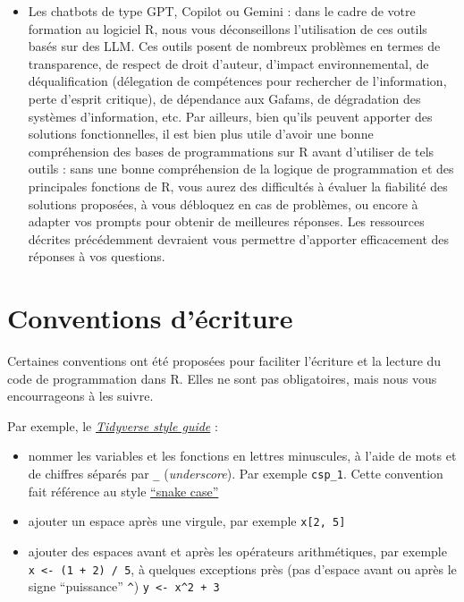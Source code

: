 \documentclass[
]{book}
\providecommand{\tightlist}{%
  \setlength{\itemsep}{0pt}\setlength{\parskip}{0pt}}
\begin{document}
\begin{itemize}
\item
  Les chatbots de type GPT, Copilot ou Gemini : dans le cadre de votre formation au logiciel R, nous vous déconseillons l'utilisation de ces outils basés sur des LLM. Ces outils posent de nombreux problèmes en termes de transparence, de respect de droit d'auteur, d'impact environnemental, de déqualification (délegation de compétences pour rechercher de l'information, perte d'esprit critique), de dépendance aux Gafams, de dégradation des systèmes d'information, etc. Par ailleurs, bien qu'ils peuvent apporter des solutions fonctionnelles, il est bien plus utile d'avoir une bonne compréhension des bases de programmations sur R avant d'utiliser de tels outils : sans une bonne compréhension de la logique de programmation et des principales fonctions de R, vous aurez des difficultés à évaluer la fiabilité des solutions proposées, à vous débloquez en cas de problèmes, ou encore à adapter vos prompts pour obtenir de meilleures réponses. Les ressources décrites précédemment devraient vous permettre d'apporter efficacement des réponses à vos questions.
\end{itemize}

\section{Conventions d'écriture}\label{conventions-duxe9criture}

Certaines conventions ont été proposées pour faciliter l'écriture et la lecture du code de programmation dans R. Elles ne sont pas obligatoires, mais nous vous encourrageons à les suivre.

Par exemple, le \href{https://style.tidyverse.org/}{\emph{Tidyverse style guide}} :

\begin{itemize}
\tightlist
\item
  nommer les variables et les fonctions en lettres minuscules, à l'aide de mots et de chiffres séparés par \texttt{\_} (\emph{underscore}). Par exemple \texttt{csp\_1}. Cette convention fait référence au style \href{https://en.wikipedia.org/wiki/Snake_case}{``snake case''}
\item
  ajouter un espace après une virgule, par exemple \texttt{x{[}2,\ 5{]}}
\item
  ajouter des espaces avant et après les opérateurs arithmétiques, par exemple \texttt{x\ \textless{}-\ (1\ +\ 2)\ /\ 5}, à quelques exceptions près (pas d'espace avant ou après le signe ``puissance'' \texttt{\^{}}) \texttt{y\ \textless{}-\ x\^{}2\ +\ 3}
\end{itemize}
\end{document}
